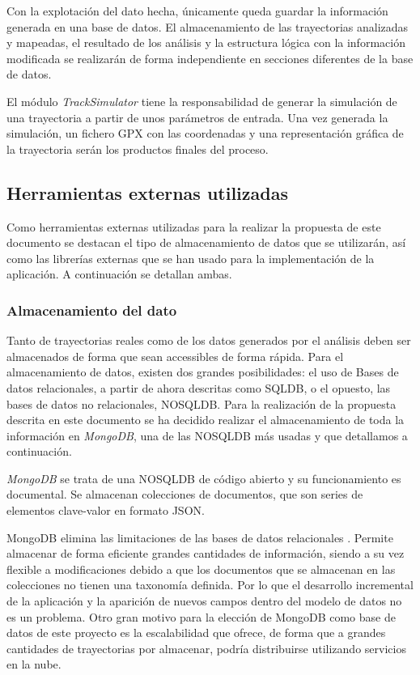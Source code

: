 Con la explotación del dato hecha, únicamente queda guardar la información generada 
en una base de datos. El almacenamiento de las trayectorias analizadas y mapeadas, el 
resultado de los análisis y la estructura lógica con la información modificada se 
realizarán de forma independiente en secciones diferentes de la base de datos.

El módulo \textit{TrackSimulator} tiene la responsabilidad de generar la simulación de 
una trayectoria a partir de unos parámetros de entrada. Una vez generada la 
simulación, un fichero \ac{GPX} con las coordenadas y una representación gráfica de la 
trayectoria serán los productos finales del proceso.
 
\subsection{Herramientas externas utilizadas} 
Como herramientas externas utilizadas para la realizar la propuesta de este documento 
se destacan el tipo de almacenamiento de datos que se utilizarán, así como las librerías 
externas que se han usado para la implementación de la aplicación. A continuación se 
detallan ambas.

\subsubsection{Almacenamiento del dato}
Tanto de trayectorias reales como de los datos generados por el análisis deben ser 
almacenados de forma que sean accessibles de forma rápida.
Para el almacenamiento de datos, existen dos grandes posibilidades: el uso de Bases 
de datos relacionales, a partir de ahora descritas como \ac{SQLDB}, o el opuesto, las 
bases de datos no relacionales, \ac{NOSQLDB}.
Para la realización de la propuesta descrita en este documento se ha decidido realizar 
el almacenamiento de toda la información en \textit{MongoDB}, una de las 
\ac{NOSQLDB} más usadas y que detallamos a continuación.

\textit{MongoDB} se trata de una \ac{NOSQLDB} de código abierto y su funcionamiento 
es documental. 
Se almacenan colecciones de documentos, que son series de elementos clave-valor en 
formato JSON. 

MongoDB elimina las limitaciones de las bases de datos relacionales \cite{Mongo01}. 
Permite almacenar de forma eficiente grandes cantidades de información, siendo
a su vez flexible a modificaciones debido a que los documentos que se almacenan en 
las colecciones no tienen 
una taxonomía definida. Por lo que el desarrollo incremental de la aplicación y la 
aparición de nuevos 
campos dentro del modelo de datos no es un problema.
Otro gran motivo para la elección de MongoDB como base de datos de este proyecto 
es la escalabilidad que ofrece, de forma que a grandes cantidades de trayectorias por 
almacenar, podría distribuirse utilizando servicios en la nube.

